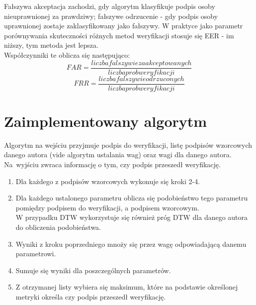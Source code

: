\documentclass[notitlepage, oneside]{report}
\begin{document}
  
  Fałszywa akceptacja zachodzi, gdy algorytm klasyfikuje podpis osoby nieuprawnionej za prawdziwy; fałszywe odrzucenie - gdy podpis osoby uprawnionej zostaje zaklasyfikowany jako fałszywy. W praktyce jako parametr porównywania skuteczności różnych metod weryfikacji stosuje się EER - im niższy, tym metoda jest lepsza. \\
  
  Współczynniki te oblicza się następująco:
  \begin{equation*}
      FAR = \frac{liczba falszywie zaakceptowanych}{liczba prob weryfikacji}
  \end{equation*}
  \begin{equation*}
      FRR = \frac{liczba falszywie odrzuconych}{liczba prob weryfikacji}
  \end{equation*}

 \section*{Zaimplementowany algorytm}
 Algorytm na wejściu przyjmuje podpis do weryfikacji, listę podpisów wzorcowych danego autora (vide algorytm ustalania wag) oraz wagi dla danego autora. Na~wyjściu zwraca informację o tym, czy podpis przeszedł weryfikację.
 \begin{enumerate}
 \item Dla każdego z podpisów wzorcowych wykonuje się kroki 2-4.
 \item Dla każdego ustalonego parametru oblicza się podobieństwo tego parametru pomiędzy podpisem do weryfikacji, a podpisem wzorcowym. \\
 W przypadku DTW wykorzystuje się również próg DTW dla danego autora do obliczenia podobieństwa.
 \item Wyniki z kroku poprzedniego mnoży się przez wagę odpowiadającą danemu parametrowi.
 \item Sumuje się wyniki dla poszczególnych parametrów.
 \item Z otrzymanej listy wybiera się maksimum, które na podstawie określonej metryki określa czy podpis przeszedł weryfikację.
 \end{enumerate}
\end{document}
